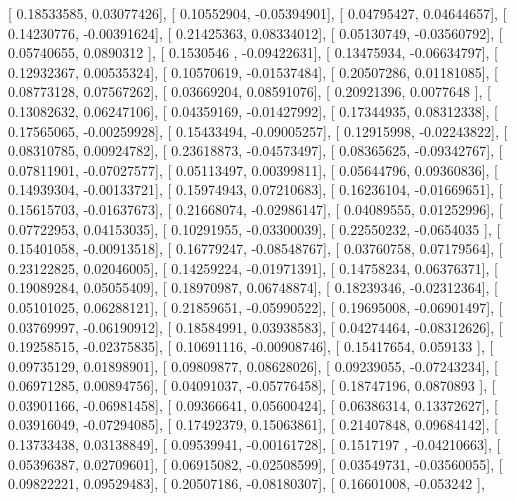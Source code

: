 \documentclass{article}
\begin{document}
       [ 0.18533585,  0.03077426],
       [ 0.10552904, -0.05394901],
       [ 0.04795427,  0.04644657],
       [ 0.14230776, -0.00391624],
       [ 0.21425363,  0.08334012],
       [ 0.05130749, -0.03560792],
       [ 0.05740655,  0.0890312 ],
       [ 0.1530546 , -0.09422631],
       [ 0.13475934, -0.06634797],
       [ 0.12932367,  0.00535324],
       [ 0.10570619, -0.01537484],
       [ 0.20507286,  0.01181085],
       [ 0.08773128,  0.07567262],
       [ 0.03669204,  0.08591076],
       [ 0.20921396,  0.0077648 ],
       [ 0.13082632,  0.06247106],
       [ 0.04359169, -0.01427992],
       [ 0.17344935,  0.08312338],
       [ 0.17565065, -0.00259928],
       [ 0.15433494, -0.09005257],
       [ 0.12915998, -0.02243822],
       [ 0.08310785,  0.00924782],
       [ 0.23618873, -0.04573497],
       [ 0.08365625, -0.09342767],
       [ 0.07811901, -0.07027577],
       [ 0.05113497,  0.00399811],
       [ 0.05644796,  0.09360836],
       [ 0.14939304, -0.00133721],
       [ 0.15974943,  0.07210683],
       [ 0.16236104, -0.01669651],
       [ 0.15615703, -0.01637673],
       [ 0.21668074, -0.02986147],
       [ 0.04089555,  0.01252996],
       [ 0.07722953,  0.04153035],
       [ 0.10291955, -0.03300039],
       [ 0.22550232, -0.0654035 ],
       [ 0.15401058, -0.00913518],
       [ 0.16779247, -0.08548767],
       [ 0.03760758,  0.07179564],
       [ 0.23122825,  0.02046005],
       [ 0.14259224, -0.01971391],
       [ 0.14758234,  0.06376371],
       [ 0.19089284,  0.05055409],
       [ 0.18970987,  0.06748874],
       [ 0.18239346, -0.02312364],
       [ 0.05101025,  0.06288121],
       [ 0.21859651, -0.05990522],
       [ 0.19695008, -0.06901497],
       [ 0.03769997, -0.06190912],
       [ 0.18584991,  0.03938583],
       [ 0.04274464, -0.08312626],
       [ 0.19258515, -0.02375835],
       [ 0.10691116, -0.00908746],
       [ 0.15417654,  0.059133  ],
       [ 0.09735129,  0.01898901],
       [ 0.09809877,  0.08628026],
       [ 0.09239055, -0.07243234],
       [ 0.06971285,  0.00894756],
       [ 0.04091037, -0.05776458],
       [ 0.18747196,  0.0870893 ],
       [ 0.03901166, -0.06981458],
       [ 0.09366641,  0.05600424],
       [ 0.06386314,  0.13372627],
       [ 0.03916049, -0.07294085],
       [ 0.17492379,  0.15063861],
       [ 0.21407848,  0.09684142],
       [ 0.13733438,  0.03138849],
       [ 0.09539941, -0.00161728],
       [ 0.1517197 , -0.04210663],
       [ 0.05396387,  0.02709601],
       [ 0.06915082, -0.02508599],
       [ 0.03549731, -0.03560055],
       [ 0.09822221,  0.09529483],
       [ 0.20507186, -0.08180307],
       [ 0.16601008, -0.053242  ],
\end{document}
